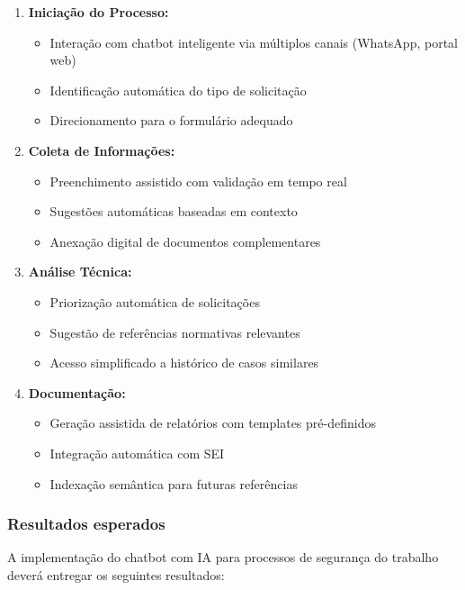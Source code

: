 \documentclass[12pt,a4paper]{article}
\begin{document}
\begin{enumerate}
    \item \textbf{Iniciação do Processo:}
    \begin{itemize}
        \item Interação com chatbot inteligente via múltiplos canais (WhatsApp, portal web)
        \item Identificação automática do tipo de solicitação
        \item Direcionamento para o formulário adequado
    \end{itemize}
    
    \item \textbf{Coleta de Informações:}
    \begin{itemize}
        \item Preenchimento assistido com validação em tempo real
        \item Sugestões automáticas baseadas em contexto
        \item Anexação digital de documentos complementares
    \end{itemize}
    
    \item \textbf{Análise Técnica:}
    \begin{itemize}
        \item Priorização automática de solicitações
        \item Sugestão de referências normativas relevantes
        \item Acesso simplificado a histórico de casos similares
    \end{itemize}
    
    \item \textbf{Documentação:}
    \begin{itemize}
        \item Geração assistida de relatórios com templates pré-definidos
        \item Integração automática com SEI
        \item Indexação semântica para futuras referências
    \end{itemize}
\end{enumerate}

\subsubsection{Resultados esperados}
A implementação do chatbot com IA para processos de segurança do trabalho deverá entregar os seguintes resultados:
\end{document}
